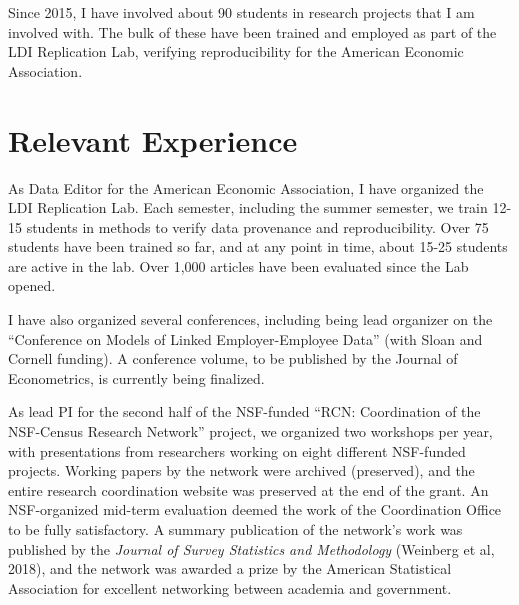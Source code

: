 \documentclass[12pt,letterpaper]{article}
\begin{document}
Since 2015, I have involved about 90 students in research projects that I am involved with. The bulk of these have been trained and employed as part of the LDI Replication Lab, verifying reproducibility for the American Economic Association.


\newpage


\section{Relevant Experience}

As Data Editor for the American Economic Association, I have organized the LDI Replication Lab. Each semester, including the summer semester, we train 12-15 students in methods to verify data provenance and reproducibility. Over 75 students have been trained so far, and at any point in time, about 15-25 students are active in the lab. Over 1,000 articles have been evaluated since the Lab opened. 

I have also organized several conferences, including being lead organizer on the ``Conference on Models of Linked Employer-Employee Data'' (with Sloan and Cornell funding). A conference volume, to be published by the Journal of Econometrics, is currently being finalized. 

As lead PI for the second half of the NSF-funded ``RCN: Coordination of the NSF-Census Research Network'' project, we organized two workshops per year, with presentations from researchers working on eight different NSF-funded projects. Working papers by the network were archived (preserved), and the entire research coordination website was preserved at the end of the grant. An NSF-organized mid-term evaluation deemed the work of the Coordination Office to be fully satisfactory. A summary publication of the network's work was published by the \textit{Journal of Survey Statistics and Methodology} (Weinberg et al, 2018), and the network was awarded a prize by the American Statistical Association for excellent networking between academia and government.
\end{document}
